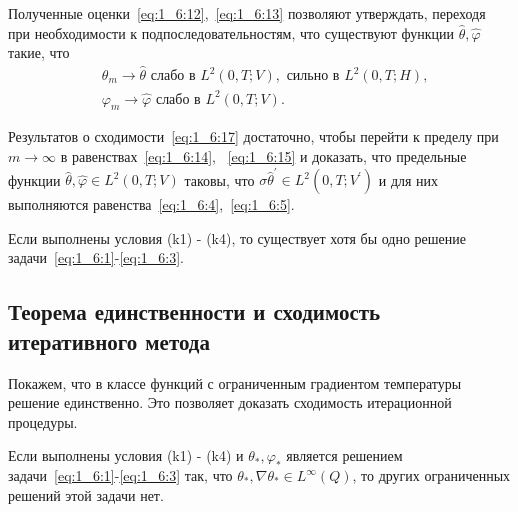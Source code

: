Полученные оценки~\eqref{eq:1_6:12},~\eqref{eq:1_6:13} позволяют утверждать,
переходя при необходимости к подпоследовательностям,
что существуют функции $\widehat{\theta}, \widehat{\varphi}$ такие, что
\begin{equation}
    \label{eq:1_6:17}
    \begin{aligned}
        & \theta_{m} \rightarrow \widehat{\theta} \text { слабо в } L^{2}(0, T ; V),
        \text { сильно в } L^{2}(0, T ; H), \\
        & \varphi_{m} \rightarrow \widehat{\varphi} \text { слабо в } L^{2}(0, T ; V).
    \end{aligned}
\end{equation}

Результатов о сходимости~\eqref{eq:1_6:17} достаточно, чтобы перейти к пределу
при $m \rightarrow \infty$ в равенствах~\eqref{eq:1_6:14}, ~\eqref{eq:1_6:15} и доказать,
что предельные функции $\widehat{\theta}, \widehat{\varphi} \in L^{2}(0, T ; V)$
таковы, что $\sigma \widehat{\theta}^{\prime} \in L^{2}\left(0, T ; V^{\prime} \right)$
и для них выполняются равенства~\eqref{eq:1_6:4},~\eqref{eq:1_6:5}.

\begin{theorem}
    \label{th:1_6:1}
    Если выполнены условия (k1) - (k4), то существует хотя бы одно
    решение задачи~\eqref{eq:1_6:1}-\eqref{eq:1_6:3}.
\end{theorem}

\subsection{Теорема единственности и сходимость итеративного метода}
\label{subsec:ch1/sec5/subsec3}
Покажем, что в классе функций с ограниченным градиентом температуры решение единственно.
Это позволяет доказать сходимость итерационной процедуры.

\begin{theorem}
    \label{th:1_6:2}
    Если выполнены условия (k1) - (k4) и $\theta_{*}, \varphi_{*}$ является
    решением задачи~\eqref{eq:1_6:1}-\eqref{eq:1_6:3}
    так, что $\theta_{*}, \nabla \theta_{*} \in L^{\infty}(Q)$,
    то других ограниченных решений этой задачи нет.
\end{theorem}

